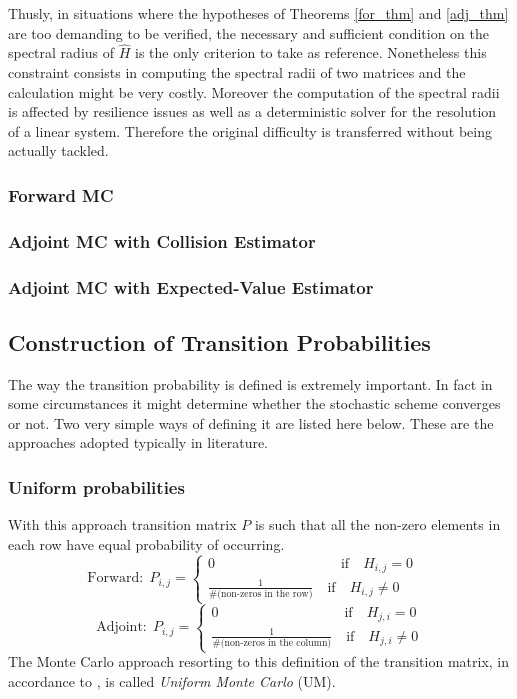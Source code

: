 \documentclass[a4paper,10pt]{article}
\begin{document}
Thusly, in situations where the hypotheses of Theorems \ref{for_thm} and
\ref{adj_thm} are too demanding to be verified, the necessary and sufficient
condition
on the
spectral radius of $\hat{H}$ is the only criterion to take as reference.
Nonetheless this constraint consists in
computing the spectral radii of two matrices and the calculation
might be very costly. Moreover the computation of the spectral radii is
affected by resilience issues as well as
a deterministic solver for the resolution of
a linear system. Therefore the original difficulty is transferred without being
actually tackled.

\subsubsection{Forward MC}

\subsubsection{Adjoint MC with Collision Estimator}

\subsubsection{Adjoint MC with Expected-Value Estimator}

\subsection{Construction of Transition Probabilities}

The way the transition probability is defined is extremely important. In fact
in some circumstances it might determine whether the stochastic scheme
converges or not. Two very simple ways of defining it are listed here
below. These are the approaches adopted typically in literature.

\subsubsection{Uniform probabilities}
With this approach transition matrix $P$ is such that all the non-zero elements
in each row have equal probability of occurring.
\[
\text{Forward}:\;P_{i,j}=
\begin{cases}
0 \quad \quad \quad \qquad \qquad \qquad \text{if}\quad H_{i,j}=0 \\
\frac{1}{\#(\text{non-zeros in the row)}} \quad \text{if} \quad H_{i,j}\ne 0
\end{cases}\quad
\]
\[
\text{Adjoint}:\;P_{i,j}=
\begin{cases}
0 \quad \quad \quad \qquad \qquad \qquad \text{if}\quad H_{j,i}=0 \\
\frac{1}{\#(\text{non-zeros in the column)}} \quad \text{if} \quad H_{j,i}\ne 0
\end{cases}
\]
The Monte Carlo approach resorting to this definition of the transition matrix,
in accordance to \cite{AADBTW2005}, is called \textit{Uniform Monte Carlo} (UM).
\end{document}
